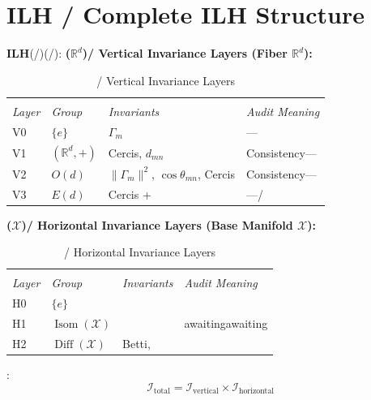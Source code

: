 \documentclass[11pt,a4paper]{article}
\theoremstyle{plain}
\theoremstyle{definition}
\theoremstyle{remark}
\newcommand{\RR}{\mathbb{R}}
\newcommand{\cX}{\mathcal{X}}
\newcommand{\cI}{\mathcal{I}}
\DeclareMathOperator{\Diff}{Diff}
\DeclareMathOperator{\Isom}{Isom}
\begin{document}
{\section{ILH / Complete ILH Structure}
\label{sec:ilh-structure}
\textbf{ILH}(/)(/): 
\medskip
\noindent\textbf{($\RR^d$)/ Vertical Invariance Layers (Fiber $\RR^d$):}
\begin{table}[h]
\centering
\begin{tabular}{p{1.2cm} p{2.5cm} p{4cm} p{4.5cm}}
\toprule
 &  &  &  \\
\textit{Layer} & \textit{Group} & \textit{Invariants} & \textit{Audit Meaning} \\
\midrule
V0 & $\{e\}$ & $\Gamma_m$ & --- \\
V1 & $(\RR^d, +)$ & Cercis, $d_{mn}$ & Consistency--- \\
V2 & $O(d)$ & $\|\Gamma_m\|^2$, $\cos\theta_{mn}$, Cercis & Consistency--- \\
V3 & $E(d)$ & Cercis + & ---/ \\
\bottomrule
\end{tabular}
\caption{ / Vertical Invariance Layers}
\end{table}
\medskip
\noindent\textbf{($\cX$)/ Horizontal Invariance Layers (Base Manifold $\cX$):}
\begin{table}[h]
\centering
\begin{tabular}{p{1.2cm} p{3.5cm} p{4cm} p{4cm}}
\toprule
 &  &  &  \\
\textit{Layer} & \textit{Group} & \textit{Invariants} & \textit{Audit Meaning} \\
\midrule
H0 & $\{e\}$ & & \\
H1 & $\Isom(\cX)$ & & awaitingawaiting \\
H2 & $\Diff(\cX)$ & Betti, & \\
\bottomrule
\end{tabular}
\caption{ / Horizontal Invariance Layers}
\end{table}
\medskip
: 
\begin{equation}
 \cI_{\text{total}} = \cI_{\text{vertical}} \times \cI_{\text{horizontal}}
\end{equation}
}
\end{document}
